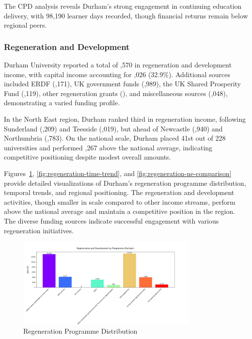 \documentclass[journal,onecolumn, 10pt,draftclsnofoot]{IEEEtran}
\begin{document}
The CPD analysis reveals Durham's strong engagement in continuing education delivery, with 98,190 learner days recorded, though financial returns remain below regional peers.

\subsubsection{Regeneration and Development}

Durham University reported a total of ,570 in regeneration and development income, with capital income accounting for ,026 (32.9\%). Additional sources included ERDF (,171), UK government funds (,989), the UK Shared Prosperity Fund (,119), other regeneration grants (), and miscellaneous sources (,048), demonstrating a varied funding profile.

In the North East region, Durham ranked third in regeneration income, following Sunderland (,209) and Teesside (,019), but ahead of Newcastle (,940) and Northumbria (,783). On the national scale, Durham placed 41st out of 228 universities and performed ,267 above the national average, indicating competitive positioning despite modest overall amounts.

Figures~\ref{fig:regeneration-programme}, \ref{fig:regeneration-time-trend}, and \ref{fig:regeneration-ne-comparison} provide detailed visualizations of Durham's regeneration programme distribution, temporal trends, and regional positioning. The regeneration and development activities, though smaller in scale compared to other income streams, perform above the national average and maintain a competitive position in the region. The diverse funding sources indicate successful engagement with various regeneration initiatives.

\begin{figure}[h]
\centering
\includegraphics[width=0.8\textwidth]{Fig/figure14.regeneration_programme.png}
\caption{Regeneration Programme Distribution}
\label{fig:regeneration-programme}
\end{figure}
\end{document}
